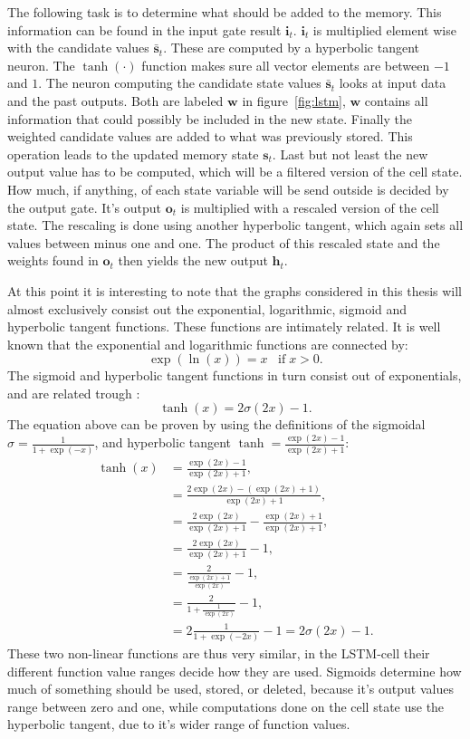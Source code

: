 The following task is to determine what should be added to the memory. This information can be found in the input gate result $\mathbf{i}_t$. $\mathbf{i}_t$ is multiplied element wise with the candidate values $\mathbf{\bar{s}}_t$. These are computed by a hyperbolic tangent neuron.  The $\tanh(\cdot)$ function makes sure all vector elements are between $-1$ and $1$. The neuron computing the candidate state values $\mathbf{\bar{s}}_t$ looks at input data and the past outputs. Both are labeled $\mathbf{w}$ in figure~\ref{fig:lstm}, $\mathbf{w}$ contains all information that could possibly be included in the new state. Finally the weighted candidate values are added to what was previously stored. This operation leads to the updated memory state $\mathbf{s}_t$.
Last but not least the new output value has to be computed, which will be a filtered version of the cell state. How much, if anything, of each state variable will be send outside is decided by the output gate. It's output $\mathbf{o}_t$ is multiplied with a rescaled version of the cell state. The rescaling is done using another hyperbolic tangent, which again sets all values between minus one and one. The product of this rescaled state and the weights found in $\mathbf{o}_t$ then yields the new output $\mathbf{h}_t$.

At this point it is interesting to note that the graphs considered in this thesis will almost exclusively consist
out the exponential, logarithmic, sigmoid and hyperbolic tangent functions. These functions are intimately related. It is well known that the exponential and logarithmic functions are connected by:
\begin{equation}
\exp(\ln(x)) = x \;\;\; \text{if} \; x > 0.
\end{equation}
The sigmoid and hyperbolic tangent functions in turn consist out of exponentials, and are related trough \cite[page 15]{Graves2008}:
\begin{equation}
\tanh(x) = 2\sigma(2x) - 1.
\end{equation}
The equation above can be proven by using the definitions of the sigmoidal $\sigma = \frac{1}{1 + \exp(-x)}$, and hyperbolic tangent $\tanh = \frac{\exp(2x) - 1}{\exp(2x) + 1}$:
\begin{align}
\tanh(x) &= \frac{\exp(2x) - 1}{\exp(2x) + 1}, \\
&= \frac{2\exp(2x) - (\exp(2x) + 1)}{\exp(2x) + 1}, \\
&= \frac{2 \exp(2x)}{\exp(2x) + 1} - \frac{\exp(2x) + 1}{\exp(2x) + 1}, \\
&= \frac{2 \exp(2x)}{\exp(2x) + 1} - 1, \\
&= \frac{2}{\frac{\exp(2x) + 1}{\exp(2x)}} - 1, \\
&= \frac{2}{1 + \frac{1}{\exp(2x)}} - 1, \\
&= 2\frac{1}{1 + \exp(-2x)} - 1 = 2\sigma(2x) - 1.
\end{align}
These two non-linear functions are thus very similar, in the LSTM-cell their different function value ranges decide how they are used. Sigmoids determine how much of something should be used, stored, or deleted, because it's output values range between zero and one, while computations done on the cell state use the hyperbolic tangent, due to it's wider range of function values.


